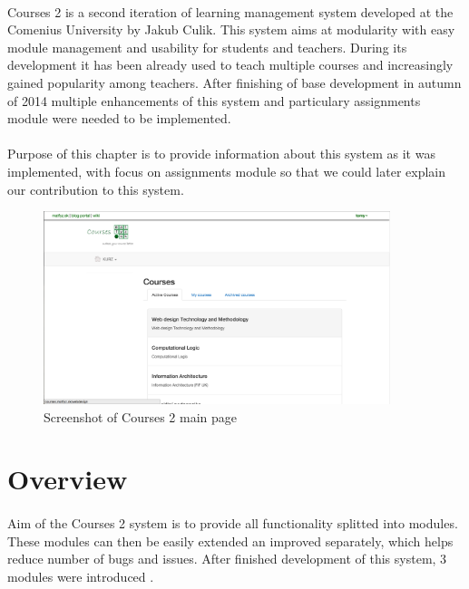 \paragraph{}
Courses 2 is a second iteration of learning management system developed at the Comenius University by Jakub Culik.  This system aims at modularity with easy module management and usability for students and teachers. During its development it has been already used to teach multiple courses and increasingly gained popularity among teachers. After finishing of base development in autumn of 2014 multiple enhancements of this system and particulary assignments module were needed to be implemented.


\paragraph{}
Purpose of this chapter is to provide information about this system as it was implemented, with focus on assignments module so that we could later explain our contribution to this system.
 
\begin{figure}[t]
    \centering
    \includegraphics[width=0.9\textwidth]{courses/screenshot.png}
    \caption{Screenshot of Courses 2 main page}
    \label{courses_main}
\end{figure}


\section{Overview}
\paragraph{}
Aim of the Courses 2 system is to provide all functionality splitted into modules. These modules can then be easily extended an improved separately, which helps reduce number of bugs and issues. After finished development of this system, 3 modules were introduced \cite{culik}.

